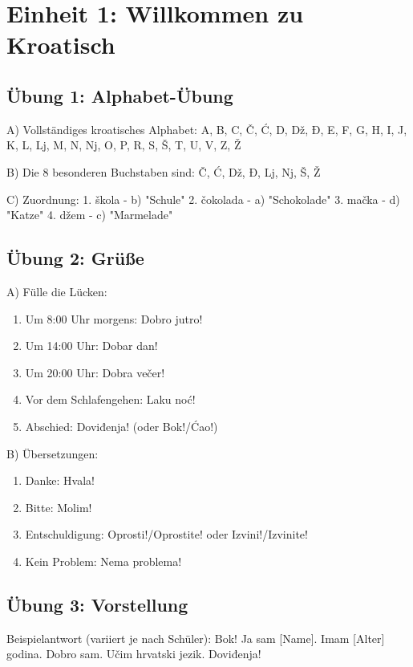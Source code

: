 
\section{Einheit 1: Willkommen zu Kroatisch}

\subsection*{Übung 1: Alphabet-Übung}

A) Vollständiges kroatisches Alphabet:
A, B, C, Č, Ć, D, Dž, Đ, E, F, G, H, I, J, K, L, Lj, M, N, Nj, O, P, R, S, Š, T, U, V, Z, Ž

B) Die 8 besonderen Buchstaben sind: Č, Ć, Dž, Đ, Lj, Nj, Š, Ž

C) Zuordnung:
1. škola - b) "Schule"
2. čokolada - a) "Schokolade"
3. mačka - d) "Katze"
4. džem - c) "Marmelade"

\subsection*{Übung 2: Grüße}

A) Fülle die Lücken:
\begin{enumerate}
    \item Um 8:00 Uhr morgens: Dobro jutro!
    \item Um 14:00 Uhr: Dobar dan!
    \item Um 20:00 Uhr: Dobra večer!
    \item Vor dem Schlafengehen: Laku noć!
    \item Abschied: Doviđenja! (oder Bok!/Ćao!)
\end{enumerate}

B) Übersetzungen:
\begin{enumerate}
    \item Danke: Hvala!
    \item Bitte: Molim!
    \item Entschuldigung: Oprosti!/Oprostite! oder Izvini!/Izvinite!
    \item Kein Problem: Nema problema!
\end{enumerate}

\subsection*{Übung 3: Vorstellung}

Beispielantwort (variiert je nach Schüler):
Bok! Ja sam [Name]. Imam [Alter] godina. Dobro sam. Učim hrvatski jezik. Doviđenja!

